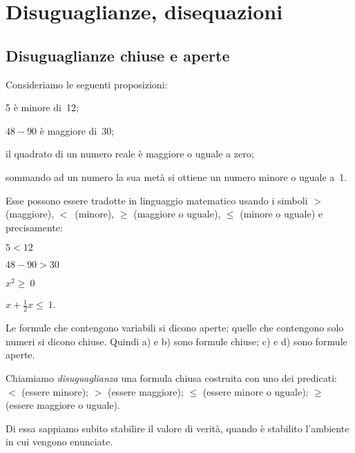 
\chapter{Disuguaglianze, disequazioni}

\section{Disuguaglianze chiuse e aperte}
\label{sec:dis_disguagianze}

Consideriamo le seguenti proposizioni:

\begin{enumeratea}
\item 5 è minore di~12;
\item $48-90$ è maggiore di~30;
\item il quadrato di un numero reale è maggiore o uguale a zero;
\item sommando ad un numero la sua metà si ottiene un numero minore
o uguale a~1.
\end{enumeratea}

Esse possono essere tradotte in linguaggio matematico usando i simboli
$>$ (maggiore), $<$~(minore), ${\geq}$ (maggiore o uguale), ${\leq}$
(minore o uguale) e precisamente:

\begin{multicols}{4}
 \begin{enumeratea}
\item $5<12$
\item $48-90>30$
\item $x^{2}\ge~0$
\item $x+\frac{1}{2}x\le~1$.
 \end{enumeratea}
\end{multicols}

Le formule che contengono variabili si dicono aperte; quelle che
contengono solo numeri si dicono chiuse. Quindi a) e b) sono formule
chiuse; c) e d) sono formule aperte.

\begin{definizione}
Chiamiamo \emph{disuguaglianza} una formula chiusa
costruita con uno dei predicati:~$<$ (essere minore);
$>$ (essere maggiore); ${\leq}$ (essere minore o uguale);
${\geq}$ (essere maggiore o uguale).
\end{definizione}

Di essa sappiamo subito stabilire il valore di verità, quando è
stabilito l'ambiente in cui vengono enunciate.

